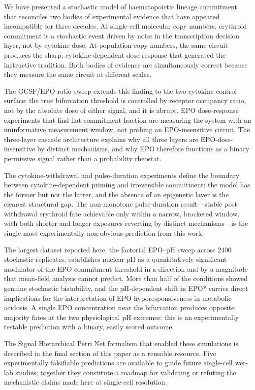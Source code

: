 
We have presented a stochastic model of haematopoietic lineage commitment that
reconciles two bodies of experimental evidence that have appeared incompatible
for three decades. At single-cell molecular copy numbers, erythroid commitment
is a stochastic event driven by noise in the transcription decision layer, not
by cytokine dose. At population copy numbers, the same circuit produces the
sharp, cytokine-dependent dose-response that generated the instructive tradition.
Both bodies of evidence are simultaneously correct because they measure the same
circuit at different scales.

The GCSF/EPO ratio sweep extends this finding to the two-cytokine control
surface: the true bifurcation threshold is controlled by receptor occupancy
ratio, not by the absolute dose of either signal, and it is abrupt. EPO
dose-response experiments that find flat commitment fraction are measuring the
system with an uninformative measurement window, not probing an EPO-insensitive
circuit. The three-layer cascade architecture explains why all three layers are
EPO-dose-insensitive by distinct mechanisms, and why EPO therefore functions
as a binary permissive signal rather than a probability rheostat.

The cytokine-withdrawal and pulse-duration experiments define the boundary
between cytokine-dependent priming and irreversible commitment: the model has
the former but not the latter, and the absence of an epigenetic layer is the
clearest structural gap. The non-monotone pulse-duration result---stable
post-withdrawal erythroid fate achievable only within a narrow, bracketed window,
with both shorter and longer exposures reverting by distinct mechanisms---is the
single most experimentally non-obvious prediction from this work.

The largest dataset reported here, the factorial EPO--pH sweep across 2400
stochastic replicates, establishes nuclear pH as a quantitatively significant
modulator of the EPO commitment threshold in a direction and by a magnitude that
mean-field analysis cannot predict. More than half of the conditions showed
genuine stochastic bistability, and the pH-dependent shift in EPO* carries direct
implications for the interpretation of EPO hyporesponsiveness in metabolic
acidosis. A single EPO concentration near the bifurcation produces opposite
majority fates at the two physiological pH extremes: this is an experimentally
testable prediction with a binary, easily scored outcome.

The Signal Hierarchical Petri Net formalism that enabled these simulations is
described in the final section of this paper as a reusable resource. Five
experimentally falsifiable predictions are available to guide future single-cell
wet-lab studies; together they constitute a roadmap for validating or refuting
the mechanistic claims made here at single-cell resolution.
